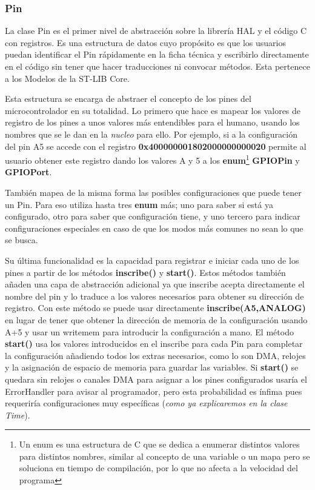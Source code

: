 \documentclass{report}
\begin{document}
\subsubsection{Pin}
La clase Pin es el primer nivel de abstracción sobre la librería HAL y el código C con registros. Es una estructura de datos cuyo propósito es que los usuarios puedan identificar el Pin rápidamente en la ficha técnica y escribirlo directamente en el código sin tener que hacer traducciones ni convocar métodos. Esta pertenece a los Modelos de la ST-LIB Core.
\par \vspace{0.3 cm}
Esta estructura se encarga de abstraer el concepto de los pines del microcontrolador en su totalidad. Lo primero que hace es mapear los valores de registro de los pines a unos valores más entendibles para el humano, usando los nombres que se le dan en la \textit{nucleo} para ello. Por ejemplo, si a la configuración del pin A5 se accede con el registro \textbf{0x400000001802000000000020} permite al usuario obtener este registro dando los valores A y 5 a los \textbf{enum}\footnote{Un enum es una estructura de C que se dedica a enumerar distintos valores para distintos nombres, similar al concepto de una variable o un mapa pero se soluciona en tiempo de compilación, por lo que no afecta a la velocidad del programa} \textbf{GPIOPin} y \textbf{GPIOPort}. 
\par \vspace{0.3 cm}
También mapea de la misma forma las posibles configuraciones que puede tener un Pin. Para eso utiliza hasta tres \textbf{enum} más; uno para saber si está ya configurado, otro para saber que configuración tiene, y uno tercero para indicar configuraciones especiales en caso de que los modos más comunes no sean lo que se busca. 
\par \vspace{0.3 cm}
Su última funcionalidad es la capacidad para registrar e iniciar cada uno de los pines a partir de los métodos \textbf{inscribe()} y \textbf{start()}. Estos métodos también añaden una capa de abstracción adicional ya que inscribe acepta directamente el nombre del pin y lo traduce a los valores necesarios para obtener su dirección de registro. Con este método se puede usar directamente \textbf{inscribe(A5,ANALOG)} en lugar de tener que obtener la dirección de memoria de la configuración usando A+5 y usar un writemem para introducir la configuración a mano. El método \textbf{start()} usa los valores introducidos en el inscribe para cada Pin para completar la configuración añadiendo todos los extras necesarios, como lo son DMA, relojes y la asignación de espacio de memoria para guardar las variables. Si \textbf{start()} se quedara sin relojes o canales DMA para asignar a los pines configurados usaría el ErrorHandler para avisar al programador, pero esta probabilidad es ínfima pues requeriría configuraciones muy específicas (\textit{como ya explicaremos en la clase Time}). \par \vspace{0.3 cm}
\end{document}
